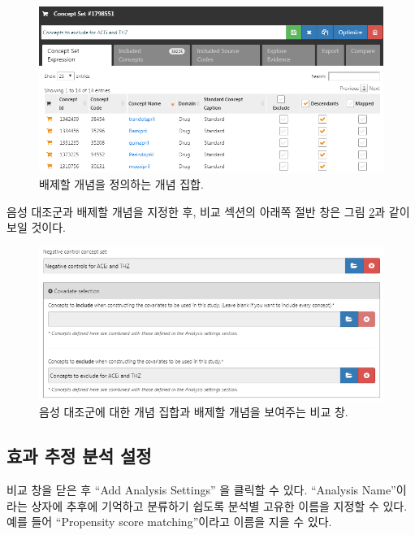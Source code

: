 \documentclass[10.5pt]{book}
\theoremstyle{definition}
\theoremstyle{definition}
\theoremstyle{definition}
\theoremstyle{remark}
\begin{document}
\begin{figure}

{\centering \includegraphics[width=1\linewidth]{images/PopulationLevelEstimation/covsToExclude} 

}

\caption{배제할 개념을 정의하는 개념 집합.}\label{fig:covsToExclude}
\end{figure}

음성 대조군과 배제할 개념을 지정한 후, 비교 섹션의 아래쪽 절반 창은 그림
\ref{fig:comparisons2}과 같이 보일 것이다.

\begin{figure}

{\centering \includegraphics[width=1\linewidth]{images/PopulationLevelEstimation/comparisons2} 

}

\caption{음성 대조군에 대한 개념 집합과 배제할 개념을 보여주는 비교 창.}\label{fig:comparisons2}
\end{figure}

\subsection{효과 추정 분석 설정}\label{---}

비교 창을 닫은 후 ``Add Analysis Settings'' 을 클릭할 수 있다.
``Analysis Name''이라는 상자에 추후에 기억하고 분류하기 쉽도록 분석별
고유한 이름을 지정할 수 있다. 예를 들어 ``Propensity score
matching''이라고 이름을 지을 수 있다.
\end{document}
